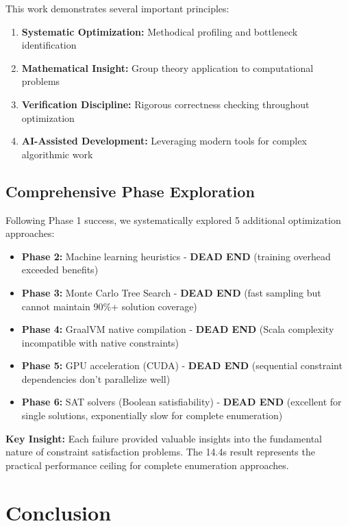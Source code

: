 \documentclass[12pt,a4paper]{article}
\theoremstyle{definition}
\begin{document}
This work demonstrates several important principles:

\begin{enumerate}
\item \textbf{Systematic Optimization:} Methodical profiling and bottleneck identification
\item \textbf{Mathematical Insight:} Group theory application to computational problems  
\item \textbf{Verification Discipline:} Rigorous correctness checking throughout optimization
\item \textbf{AI-Assisted Development:} Leveraging modern tools for complex algorithmic work
\end{enumerate}

\subsection{Comprehensive Phase Exploration}

Following Phase 1 success, we systematically explored 5 additional optimization approaches:

\begin{itemize}
\item \textbf{Phase 2:} Machine learning heuristics - \textbf{DEAD END} (training overhead exceeded benefits)
\item \textbf{Phase 3:} Monte Carlo Tree Search - \textbf{DEAD END} (fast sampling but cannot maintain 90\%+ solution coverage)  
\item \textbf{Phase 4:} GraalVM native compilation - \textbf{DEAD END} (Scala complexity incompatible with native constraints)
\item \textbf{Phase 5:} GPU acceleration (CUDA) - \textbf{DEAD END} (sequential constraint dependencies don't parallelize well)
\item \textbf{Phase 6:} SAT solvers (Boolean satisfiability) - \textbf{DEAD END} (excellent for single solutions, exponentially slow for complete enumeration)
\end{itemize}

\textbf{Key Insight:} Each failure provided valuable insights into the fundamental nature of constraint satisfaction problems. The 14.4s result represents the practical performance ceiling for complete enumeration approaches.

\section{Conclusion}
\end{document}
